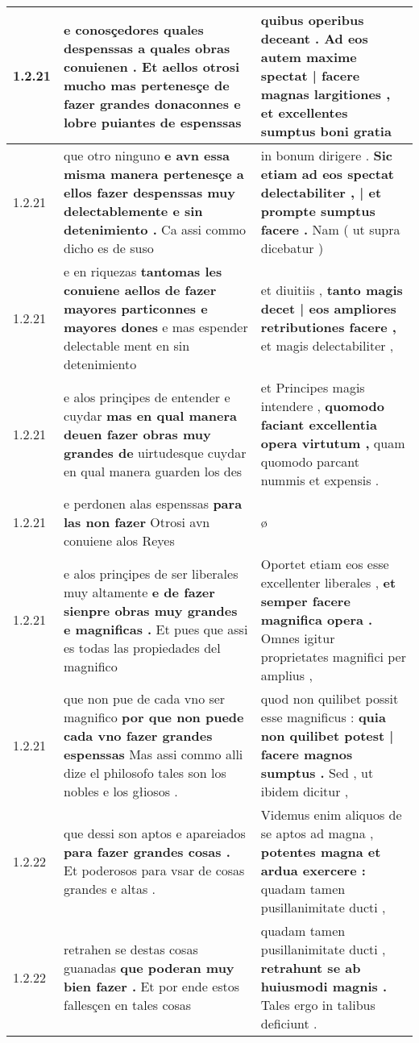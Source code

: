 \begin{tabular}{|p{1cm}|p{6.5cm}|p{6.5cm}|}
1.2.21 & e conosçedores quales despenssas a quales obras conuienen . \textbf{ Et aellos otrosi mucho mas pertenesçe de fazer grandes donaconnes } e lobre puiantes de espenssas & quibus operibus deceant . \textbf{ Ad eos autem maxime spectat | facere magnas largitiones , } et excellentes sumptus boni gratia \\\hline
1.2.21 & que otro ninguno \textbf{ e avn essa misma manera pertenesçe a ellos fazer despenssas muy delectablemente e sin detenimiento . } Ca assi commo dicho es de suso & in bonum dirigere . \textbf{ Sic etiam ad eos spectat delectabiliter , | et prompte sumptus facere . } Nam ( ut supra dicebatur ) \\\hline
1.2.21 & e en riquezas \textbf{ tantomas les conuiene aellos de fazer mayores particonnes e mayores dones } e mas espender delectable ment en sin detenimiento & et diuitiis , \textbf{ tanto magis decet | eos ampliores retributiones facere , } et magis delectabiliter , \\\hline
1.2.21 & e alos prinçipes de entender e cuydar \textbf{ mas en qual manera deuen fazer obras muy grandes de } uirtudesque cuydar en qual manera guarden los des & et Principes magis intendere , \textbf{ quomodo faciant excellentia opera virtutum , } quam quomodo parcant nummis et expensis . \\\hline
1.2.21 & e perdonen alas espenssas \textbf{ para las non fazer } Otrosi avn conuiene alos Reyes & ø \\\hline
1.2.21 & e alos prinçipes de ser liberales muy altamente \textbf{ e de fazer sienpre obras muy grandes e magnificas . } Et pues que assi es todas las propiedades del magnifico & Oportet etiam eos esse excellenter liberales , \textbf{ et semper facere magnifica opera . } Omnes igitur proprietates magnifici per amplius , \\\hline
1.2.21 & que non pue de cada vno ser magnifico \textbf{ por que non puede cada vno fazer grandes espenssas } Mas assi commo alli dize el philosofo tales son los nobles e los głiosos . & quod non quilibet possit esse magnificus : \textbf{ quia non quilibet potest | facere magnos sumptus . } Sed , ut ibidem dicitur , \\\hline
1.2.22 & que dessi son aptos e apareiados \textbf{ para fazer grandes cosas . } Et poderosos para vsar de cosas grandes e altas . & Videmus enim aliquos de se aptos ad magna , \textbf{ potentes magna et ardua exercere : } quadam tamen pusillanimitate ducti , \\\hline
1.2.22 & retrahen se destas cosas guanadas \textbf{ que poderan muy bien fazer . } Et por ende estos fallesçen en tales cosas & quadam tamen pusillanimitate ducti , \textbf{ retrahunt se ab huiusmodi magnis . } Tales ergo in talibus deficiunt . \\\hline

\end{tabular}
